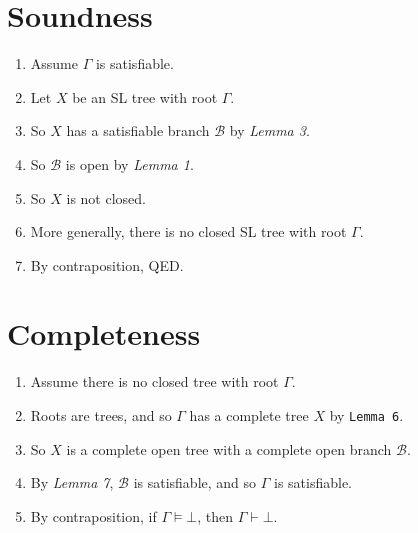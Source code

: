 \documentclass[a4paper, 11pt]{article} %
\newcommand{\B}{\mathcal{B}}
\begin{document}
\section*{Soundness}

\begin{enumerate}
  \item Assume $\Gamma$ is satisfiable. 
  \item Let $X$ be an SL tree with root $\Gamma$. 
  \item So $X$ has a satisfiable branch $\B$ by \textit{Lemma 3}. 
  \item So $\B$ is open by \textit{Lemma 1}. 
  \item So $X$ is not closed. 
  \item More generally, there is no closed SL tree with root $\Gamma$. 
  \item By contraposition, QED.
\end{enumerate}




\section*{Completeness}

\begin{enumerate}
  \item Assume there is no closed tree with root $\Gamma$.
  \item Roots are trees, and so $\Gamma$ has a complete tree $X$ by \texttt{Lemma 6}.
  \item So $X$ is a complete open tree with a complete open branch $\B$.
  \item By \textit{Lemma 7}, $\B$ is satisfiable, and so $\Gamma$ is satisfiable. 
  \item By contraposition, if $\Gamma \vDash \bot$, then $\Gamma \vdash \bot$.
\end{enumerate}
\end{document}
